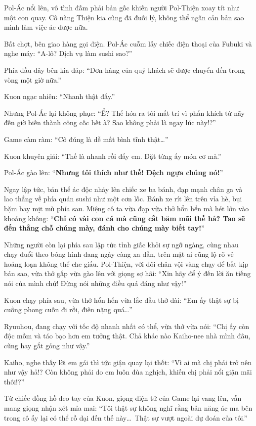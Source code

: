 \documentclass[../main.tex]{subfiles}
\begin{document}
Pol-Ác nổi lên, vô tình đấm phải bản gốc khiến người Pol-Thiện xoay tít như một con quay. Cô nàng Thiện kia cũng đã đuối lý, không thể ngăn cản bản sao mình làm việc ác được nữa.

Bất chợt, bên giao hàng gọi điện. Pol-Ác cuỗm lấy chiếc điện thoại của Fubuki và nghe máy: ``A-lô? Dịch vụ làm sushi sao?''

Phía đầu dây bên kia đáp: ``Đơn hàng của quý khách sẽ được chuyển đến trong vòng một giờ nữa.''

Kuon ngạc nhiên: ``Nhanh thật đấy.''

Nhưng Pol-Ác lại không phục: ``Ể? Thế hóa ra tôi mất trí vì phấn khích từ nãy đến giờ biến thành công cốc hết à? Sao không phải là ngay lúc này!?''

Game càm ràm: ``Cô đúng là dễ mất bình tĩnh thật\dots''

Kuon khuyên giải: ``Thế là nhanh rồi đấy em. Đặt từng ấy món cơ mà.''

Pol-Ác gào lên: ``\textbf{Nhưng tôi thích như thế! Đệch ngựa chúng nó!}''

Ngay lập tức, bản thể ác độc nhảy lên chiếc xe ba bánh, đạp mạnh chân ga và lao thẳng về phía quán sushi như một cơn lốc. Bánh xe rít lên trên vỉa hè, bụi bặm bay mịt mù phía sau. Miệng cô ta vừa đạp vừa thở hổn hển mà hét lớn vào khoảng không: ``\textbf{Chỉ có vài con cá mà cũng cắt băm mãi thế hả? Tao sẽ đến thẳng chỗ chúng mày, đánh cho chúng mày biết tay!}''

Những người còn lại phía sau lập tức tỉnh giấc khỏi sự ngỡ ngàng, cùng nhau chạy đuổi theo bóng hình đang ngày càng xa dần, trên mặt ai cũng lộ rõ vẻ hoảng loạn không thể che giấu. Pol-Thiện, với đôi chân vội vàng chạy để bắt kịp bản sao, vừa thở gấp vừa gào lên với giọng sợ hãi: ``Xin hãy để ý đến lời ăn tiếng nói của mình chứ! Đừng nói những điều quá đáng như vậy!''


Kuon chạy phía sau, vừa thở hổn hển vừa lắc đầu thở dài: ``Em ấy thật sự bị cuồng phong cuốn đi rồi, điên nặng quá\dots''

Ryuuhou, đang chạy với tốc độ nhanh nhất có thể, vừa thở vừa nói: ``Chị ấy còn độc mồm và táo bạo hơn em tưởng thật. Chả khác nào Kaiho-nee nhà mình đâu, cũng hay gắt gỏng như vậy.''

Kaiho, nghe thấy lời em gái thì tức giận quay lại thốt: ``Vì ai mà chị phải trở nên như vậy hả!? Còn không phải do em luôn đùa nghịch, khiến chị phải nổi giận mãi thôi!?''

Từ chiếc đồng hồ đeo tay của Kuon, giọng điện tử của Game lại vang lên, vẫn mang giọng nhận xét mỉa mai: ``Tôi thật sự không nghĩ rằng bản năng ác ma bên trong cô ấy lại có thể rồ dại đến thế này\dots\ Thật sự vượt ngoài dự đoán của tôi.''
\end{document}
